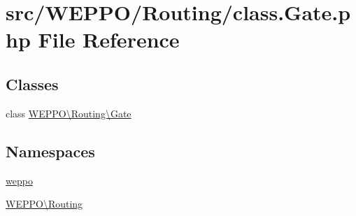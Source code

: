 \hypertarget{class_8Gate_8php}{}\section{src/\+W\+E\+P\+P\+O/\+Routing/class.Gate.\+php File Reference}
\label{class_8Gate_8php}
\subsection*{Classes}
\begin{DoxyCompactItemize}
\item 
class \hyperlink{classWEPPO_1_1Routing_1_1Gate}{W\+E\+P\+P\+O\textbackslash{}\+Routing\textbackslash{}\+Gate}
\end{DoxyCompactItemize}
\subsection*{Namespaces}
\begin{DoxyCompactItemize}
\item 
 \hyperlink{namespaceweppo}{weppo}
\item 
 \hyperlink{namespaceWEPPO_1_1Routing}{W\+E\+P\+P\+O\textbackslash{}\+Routing}
\end{DoxyCompactItemize}
